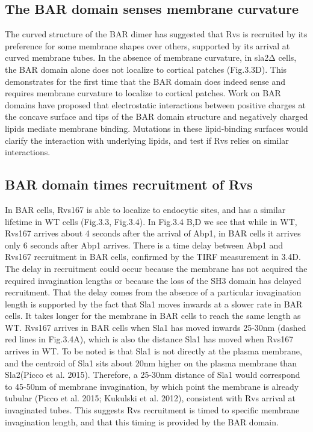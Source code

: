 \subsection{The BAR domain senses membrane curvature}
The curved structure of the BAR dimer has suggested that Rvs is recruited by its preference for some membrane shapes over others, supported by its arrival at curved membrane tubes. In the absence of membrane curvature, in sla2Δ cells, the BAR domain alone does not localize to cortical patches (Fig.3.3D). This demonstrates for the first time that the BAR domain does indeed sense and requires membrane curvature to localize to cortical patches. Work on BAR domains have proposed that electrostatic interactions between positive charges at the concave surface and tips of the BAR domain structure and negatively charged lipids mediate membrane binding. Mutations in these lipid-binding surfaces would clarify the interaction with underlying lipids, and test if Rvs relies on similar interactions.



\subsection{BAR domain times recruitment of Rvs} 

In BAR cells, Rvs167 is able to localize to endocytic sites, and has a similar lifetime in WT cells (Fig.3.3, Fig.3.4). In Fig.3.4 B,D we see that while in WT, Rvs167 arrives about 4 seconds after the arrival of Abp1, in BAR cells it arrives only 6 seconds after Abp1 arrives. There is a time delay between Abp1 and Rvs167 recruitment in BAR cells, confirmed by the TIRF measurement in 3.4D. 
	\vspace{5mm}
The delay in recruitment could occur because the membrane has not acquired the required invagination lengths or because the loss of the SH3 domain has delayed recruitment. That the delay comes from the absence of a particular invagination length is supported by the fact that Sla1 moves inwards at a slower rate in BAR cells. It takes longer for the membrane in BAR cells to reach the same length as WT. Rvs167 arrives in BAR cells when Sla1 has moved inwards 25-30nm (dashed red lines in Fig.3.4A), which is also the distance Sla1 has moved when Rvs167 arrives in WT. To be noted is that Sla1 is not directly at the plasma membrane, and the centroid of Sla1 sits about 20nm higher on the plasma membrane than Sla2(Picco et al. 2015). Therefore, a 25-30nm distance of Sla1 would correspond to 45-50nm of membrane invagination, by which point the membrane is already tubular (Picco et al. 2015; Kukulski et al. 2012), consistent with Rvs arrival at invaginated tubes. This suggests Rvs recruitment is timed to specific membrane invagination length, and that this timing is provided by the BAR domain. 


